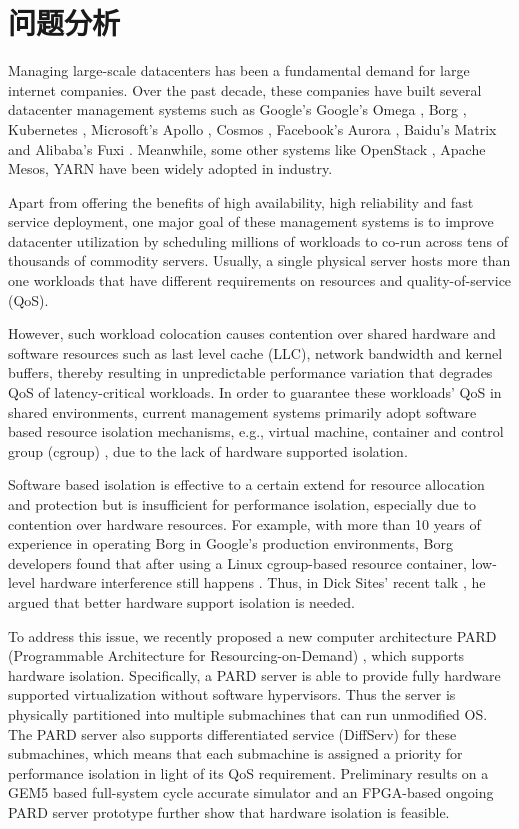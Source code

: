 \section{问题分析}

Managing large-scale datacenters has been a fundamental demand
for large internet companies. Over the past decade, these companies
have built several datacenter management systems such as Google's
Google's Omega \cite{Schwarzkopf_omega_2013}, Borg \cite{borg:2015},
Kubernetes \cite{Kubernetes}, Microsoft's Apollo \cite{Apollo},
Cosmos \cite{Cosmos}, Facebook's Aurora \cite{Aurora},
Baidu's Matrix \cite{} and Alibaba's Fuxi \cite{Fuxi}.
Meanwhile, some other systems like
OpenStack \cite{OpenStack}, Apache Mesos\cite{Hindman:2011:Mesos},
YARN \cite{YARN} have been widely adopted in industry.

Apart from offering the benefits of high availability,
high reliability and fast service deployment,
one major goal of these management systems is to improve
datacenter utilization by scheduling millions of workloads
to co-run across tens of thousands of commodity servers.
Usually, a single physical server hosts more than one workloads
that have different requirements on resources and
quality-of-service (QoS).

However, such workload colocation causes contention over shared hardware and software
resources such as last level cache (LLC), network bandwidth and kernel buffers, thereby
resulting in unpredictable performance variation that degrades QoS of
latency-critical workloads.
In order to guarantee these workloads' QoS in shared environments,
current management systems primarily adopt software based resource
isolation mechanisms, e.g., virtual machine, container and
control group (cgroup) \cite{cgroup}, due to the lack of hardware supported isolation.

Software based isolation is effective to a certain extend for resource allocation
and protection but is insufficient for performance isolation, especially due to
contention over hardware resources. For example, with more than 10 years of
experience in operating Borg in Google's production environments, Borg developers
found that after using a Linux cgroup-based resource container, low-level
hardware interference still happens \cite{Google:2015:Borg}.
Thus, in Dick Sites' recent talk \cite{}, he argued that better hardware
support isolation is needed.

To address this issue, we recently proposed a new computer architecture PARD
(Programmable Architecture for Resourcing-on-Demand) \cite{Ma:2015:PARD}, which
supports hardware isolation. Specifically, a PARD server is able to provide fully hardware supported
virtualization without software hypervisors. Thus the server is
physically partitioned into multiple submachines that can run unmodified OS.
The PARD server also supports differentiated service (DiffServ) for these submachines,
which means that each submachine is assigned a priority for performance isolation
in light of its QoS requirement. Preliminary results on
a GEM5 \cite{binkert_gem5_2011} based full-system
cycle accurate simulator and an FPGA-based ongoing PARD server prototype
further show that hardware isolation is feasible.

